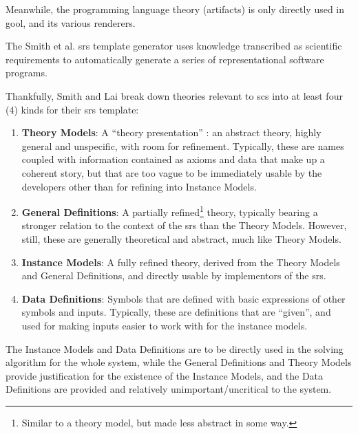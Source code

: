 Meanwhile, the programming language theory (artifacts) is only directly used in
\acs{gool}, and its various renderers.

The Smith et al. \acs{srs} \cite{SmithAndLai2005} template generator uses
knowledge transcribed as scientific requirements to automatically generate a
series of representational software programs.

Thankfully, Smith and Lai \cite{SmithAndLai2005} break down theories relevant to
\acs{scs} into at least four (4) kinds for their \acs{srs} template:

\begin{enumerate}

	\item \textbf{Theory Models}: A ``theory presentation'' : an abstract theory, highly
	      general and unspecific, with room for refinement. Typically, these
	      are names coupled with information contained as axioms and data
	      that make up a coherent story, but that are too vague to be
	      immediately usable by the developers other than for refining into
	      Instance Models.

	\item \textbf{General Definitions}: A partially refined\footnote{Similar to
	      a theory model, but made less abstract in some way.} theory,
	      typically bearing a stronger relation to the context of the \acs{srs}
	      than the Theory Models. However, still, these are generally
	      theoretical and abstract, much like Theory Models.

	\item \textbf{Instance Models}: A fully refined theory, derived from the
	      Theory Models and General Definitions, and directly usable by
	      implementors of the \acs{srs}.

	\item \textbf{Data Definitions}: Symbols that are defined with basic
	      expressions of other symbols and inputs. Typically, these are
	      definitions that are ``given'', and used for making inputs easier to
	      work with for the instance models.

\end{enumerate}


The Instance Models and Data Definitions are to be directly used in the solving
algorithm for the whole system, while the General Definitions and Theory Models
provide justification for the existence of the Instance Models, and the Data
Definitions are provided and relatively unimportant/uncritical to the system.




